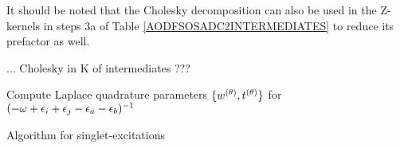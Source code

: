 It should be noted that the Cholesky decomposition can also be used in the Z-kernels in steps 3a of Table \ref{AODFSOSADC2INTERMEDIATES} to reduce its prefactor as well. 

... Cholesky in K of intermediates ???

\begin{algorithm}
Compute Laplace quadrature parameters $\{w^{(\theta)},t^{(\theta)}\}$ for $(-\omega + \epsilon_i + \epsilon_j - \epsilon_a - \epsilon_b)^{-1}$
\\
\caption{Algorithm for singlet-excitations}
\label{AODFSOSADC2EOB}
\end{algorithm}
%
